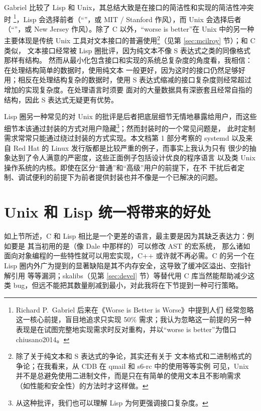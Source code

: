 Gabriel 比较了 Lisp 和 Unix，其总结大致是在接口的简洁性和实现的简洁性冲突时%
\footnote{Richard P.\ Gabriel 后来在《Worse is Better is Worse》中提到人们
经常忽略这一核心前提，盲目地追求只实现 50\% 需求；我认为忽略这一前提的另一种
表现是在试图完整地实现需求时反对重构，并以“worse is better”为借口\cupercite%
{chiusano2014}。}，Lisp 会选择前者（“”，或 MIT /
Stanford 作风），而 Unix 会选择后者（“”，或 New Jersey
作风）。除了 C 以外，“worse is better”在 Unix 中的另一种主要体现是传统 Unix
工具对文本接口的普遍使用\footnote{除了关于纯文本和 S 表达式的争论，其实还有关于
文本格式和二进制格式的争论；在我看来，从 CDB 在 qmail 和 s6-rc 中的使用等等实例
可见，Unix 并不是总避免使用二进制文件，而是只在有简单的使用文本且不影响需求
（如性能和安全性）的方法时才这样做。}（见第 \ref{sec:mcilroy} 节）；和 C 类似，
文本接口经常被 Lisp 圈批评，因为纯文本不像 S 表达式之类的同像格式那样有结构。
然而从最小化包含接口和实现的系统总复杂度的角度看，我相信：在处理结构简单的数据时，使用纯文本
一般更好，因为这时的接口仍然足够好用；相反在处理结构复杂的数据时，使用
S 表达式缩减的接口复杂度则经常超过增加的实现复杂度。在处理语言时须要
面对的大量数据具有深嵌套且经常自指的结构，因此 S 表达式无疑更有优势。

Lisp 圈另一种常见的对 Unix 的批评是后者把底层细节无情地暴露给用户，而这些
细节本该通过封装的方式对用户隐藏\footnote{从这种批评，我们也可以理解 Lisp
为何更强调接口复杂度。}；然而封装时的一个常见问题是，
此时定制需求常常只能通过绕过封装的方式实现。本文档第 1 部分考察的 systemd
以及来自 Red Hat 的 Linux 发行版都是比较严重的例子，而事实上我认为只有
很少的抽象达到了令人满意的严密度，这些正面例子包括设计优良的程序语言
以及类 Unix 操作系统的内核。即使在区分“普通”和“高级”用户的前提下，在不
干扰后者定制、调试便利的前提下为前者提供封装也并不像是一个已解决的问题。

\section{Unix 和 Lisp 统一将带来的好处}\label{sec:benefits}

如上节所述，C 和 Lisp 相比是一个更差的语言，最主要是因为其缺乏表达力：例如要是
其当初用的是（像 Dale 中那样的）可以修改 AST 的宏系统，
那么诸如面向对象编程的一些特性就可以用宏实现，C++ 或许就不再必需。C 的另一个在
Lisp 圈内外广为提到的显著缺陷是其不内存安全，这导致了缓冲区溢出、空指针解引用
等等漏洞；skalibs（见第 \ref{sec:devel} 节）等替代用 C 库当然能帮助减少这类
bug，但远不能把其数量削减到最小，对此我将在下节提到一种可行策略。

